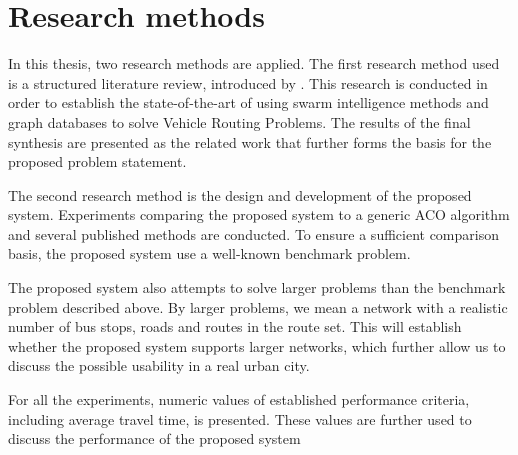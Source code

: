 \section{Research methods}


In this thesis, two research methods are applied. The first research method used is a structured literature review, introduced by \citep{kofod2014}. This research is conducted in order to establish the state-of-the-art of using swarm intelligence methods and graph databases to solve Vehicle Routing Problems. The results of the final synthesis are presented as the related work that further forms the basis for the proposed problem statement. 

The second research method is the design and development of the proposed system. Experiments comparing the proposed system to a generic ACO algorithm and several published methods are conducted. To ensure a sufficient comparison basis, the proposed system use a well-known benchmark problem.  

The proposed system also attempts to solve larger problems than the benchmark problem described above. By larger problems, we mean a network with a realistic number of bus stops, roads and routes in the route set. This will establish whether the proposed system supports larger networks, which further allow us to discuss the possible usability in a real urban city. 

For all the experiments, numeric values of established performance criteria, including average travel time, is presented. These values are further used to discuss the performance of the proposed system




